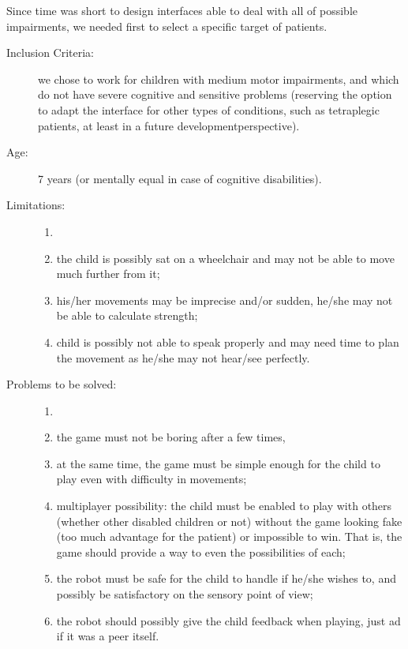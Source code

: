 \documentclass[a4paper,twoside]{book}
\begin{document}
\beforelist Since time was short to design interfaces able to deal with all of possible impairments, we needed first to select a specific target of patients.
\begin{description}
\item[Inclusion Criteria:] we chose to work for children with medium motor impairments, and which do not have severe cognitive and sensitive problems (reserving the option to adapt the interface for other types of conditions, such as tetraplegic patients, at least in a future development\textendash perspective).
\item[Age:] 7 years (or mentally equal in case of cognitive disabilities).
\item[Limitations:]
  \begin{enumerate}
    \item[]
    \item the child is possibly sat on a wheelchair and may not be able to move much further from it;
    \item his/her movements may be imprecise and/or sudden, he/she may not be able to calculate strength;
    \item child is possibly not able to speak properly and may need time to plan the movement as he/she may not hear/see perfectly.
  \end{enumerate}
\item[Problems to be solved:]
  \begin{enumerate}
    \item[]
    \item the game must not be boring after a few times,
    \item at the same time, the game must be simple enough for the child to play even with difficulty in movements;
    \item multi\textendash player possibility: the child must be enabled to play with others (whether other disabled children or not) without the game looking fake (too much advantage for the patient) or impossible to win. That is, the game should provide a way to even the possibilities of each;
    \item the robot must be safe for the child to handle if he/she wishes to, and possibly be satisfactory on the sensory point of view;
    \item the robot should possibly give the child feedback when playing, just ad if it was a peer itself.
  \end{enumerate}
\end{description}
\afterlist*
\end{document}
